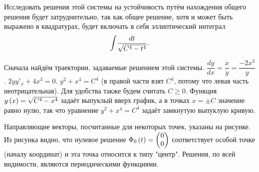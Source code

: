 \documentclass[a5paper,10pt]{article}
\begin{document}
Исследовать решения этой системы на устойчивость путём нахождения общего решения будет затруднительно, так как общее решение, хотя и может быть выражено в квадратурах, будет включать в себя эллиптический интеграл
$$\mathlarger{\int}{\frac {dt} {\sqrt{C^4 - t^4}}}.$$

Сначала найдём траектории, задаваемые решением этой системы. $\dfrac {dy} {dx} = \dfrac {\dot{x}} {\dot{y}} = \dfrac {-2x^3} {y}$. $2yy'_{x} + 4x^3 = 0$. $y^2 + x^4 = C^4$ (в правой части взят $C^4$, потому что левая часть неотрицательная). Для удобства также будем считать $C \ge 0$. Функция $y\left(x\right) = \sqrt{C^4 - x^4}$ задаёт выпуклый вверх график, а в точках $x = \pm C$ значение равно нулю, так что уравнение $y^2 + x^4 = C^4$ задаёт замкнутую выпуклую кривую.

Направляющие векторы, посчитанные для некоторых точек, указаны на рисунке. Из рисунка видно, что нулевое решение $\Phi_{0}\left(t\right) = \begin{pmatrix} 0 \\ 0 \end{pmatrix}$ соответствует особой точке (началу координат) и эта точка относится к типу "центр". Решения, по всей видимости, являются периодическими функциями.
\end{document}
